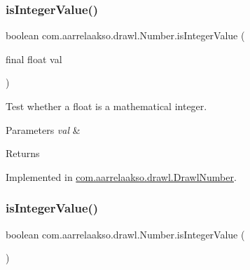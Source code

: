 \mbox{\label{interfacecom_1_1aarrelaakso_1_1drawl_1_1_number_a731dbb91dcfd46319662f57c26fcf06a}} 
\subsubsection{\texorpdfstring{is\+Integer\+Value()}{isIntegerValue()}\hspace{0.1cm}{\footnotesize\ttfamily [2/3]}}
{\footnotesize\ttfamily boolean com.\+aarrelaakso.\+drawl.\+Number.\+is\+Integer\+Value (\begin{DoxyParamCaption}\item[{final float}]{val }\end{DoxyParamCaption})}



Test whether a float is a mathematical integer. 


\begin{DoxyParams}{Parameters}
{\em val} & \\
\hline
\end{DoxyParams}
\begin{DoxyReturn}{Returns}

\end{DoxyReturn}


Implemented in \hyperlink{classcom_1_1aarrelaakso_1_1drawl_1_1_drawl_number_a6400df8bf99b502371a39347f8d7dff2}{com.\+aarrelaakso.\+drawl.\+Drawl\+Number}.

\mbox{\label{interfacecom_1_1aarrelaakso_1_1drawl_1_1_number_a33d0b6d8f3aeb0ccb9f710739c80f6e7}} 
\subsubsection{\texorpdfstring{is\+Integer\+Value()}{isIntegerValue()}\hspace{0.1cm}{\footnotesize\ttfamily [3/3]}}
{\footnotesize\ttfamily boolean com.\+aarrelaakso.\+drawl.\+Number.\+is\+Integer\+Value (\begin{DoxyParamCaption}{ }\end{DoxyParamCaption})}



